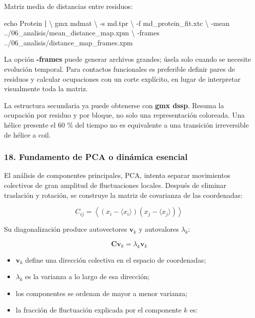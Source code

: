\documentclass[
  spanish,
  11pt,
  a4paper]{article}
\newenvironment{Shaded}{\begin{snugshade}}{\end{snugshade}}
\newcommand{\AttributeTok}[1]{\textcolor[rgb]{0.13,0.29,0.53}{#1}}
\newcommand{\BuiltInTok}[1]{#1}
\newcommand{\DataTypeTok}[1]{\textcolor[rgb]{0.13,0.29,0.53}{#1}}
\newcommand{\ExtensionTok}[1]{#1}
\newcommand{\KeywordTok}[1]{\textcolor[rgb]{0.13,0.29,0.53}{\textbf{#1}}}
\newcommand{\NormalTok}[1]{#1}
\providecommand{\tightlist}{%
  \setlength{\itemsep}{0pt}\setlength{\parskip}{0pt}}
\begin{document}
Matriz media de distancias entre residuos:

\begin{Shaded}
\begin{Highlighting}[]
\BuiltInTok{echo}\NormalTok{ Protein }\KeywordTok{|} \DataTypeTok{\textbackslash{}}
\ExtensionTok{gmx}\NormalTok{ mdmat }\DataTypeTok{\textbackslash{}}
    \AttributeTok{{-}s}\NormalTok{ md.tpr }\DataTypeTok{\textbackslash{}}
    \AttributeTok{{-}f}\NormalTok{ md\_protein\_fit.xtc }\DataTypeTok{\textbackslash{}}
    \AttributeTok{{-}mean}\NormalTok{ ../06\_analisis/mean\_distance\_map.xpm }\DataTypeTok{\textbackslash{}}
    \AttributeTok{{-}frames}\NormalTok{ ../06\_analisis/distance\_map\_frames.xpm}
\end{Highlighting}
\end{Shaded}

La opción \textbf{-frames} puede generar archivos grandes; úsela solo
cuando se necesite evolución temporal. Para contactos funcionales es
preferible definir pares de residuos y calcular ocupaciones con un corte
explícito, en lugar de interpretar visualmente toda la matriz.

La estructura secundaria ya puede obtenerse con \textbf{gmx dssp}.
Resuma la ocupación por residuo y por bloque, no solo una representación
coloreada. Una hélice presente el 60 \% del tiempo no es equivalente a
una transición irreversible de hélice a coil.

\subsubsection{18. Fundamento de PCA o dinámica
esencial}\label{fundamento-de-pca-o-dinuxe1mica-esencial}

El análisis de componentes principales, PCA, intenta separar movimientos
colectivos de gran amplitud de fluctuaciones locales. Después de
eliminar traslación y rotación, se construye la matriz de covarianza de
las coordenadas:

\[
C_{ij}=\left\langle
\left(x_i-\langle x_i\rangle\right)
\left(x_j-\langle x_j\rangle\right)
\right\rangle
\]

Su diagonalización produce autovectores \(\mathbf{v}_k\) y autovalores
\(\lambda_k\):

\[
\mathbf{C}\mathbf{v}_k=\lambda_k\mathbf{v}_k
\]

\begin{itemize}
\tightlist
\item
  \(\mathbf{v}_k\) define una dirección colectiva en el espacio de
  coordenadas;
\item
  \(\lambda_k\) es la varianza a lo largo de esa dirección;
\item
  los componentes se ordenan de mayor a menor varianza;
\item
  la fracción de fluctuación explicada por el componente \(k\) es:
\end{itemize}
\end{document}

